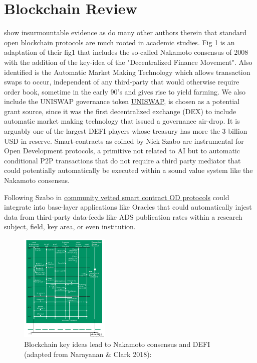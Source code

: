 \documentclass[final,5p,times,twocolumn,authoryear]{elsarticle}
\begin{document}
\section{Blockchain Review}
\label{sec:bc_review}
\cite{20d30b4efb014b21b7ab27f5218692ab} show insurmountable evidence as do many other authors therein that standard open blockchain protocols are much rooted in academic studies. Fig \ref{fig:narayanan} is an adaptation of their fig1 that includes the so-called Nakamoto consensus of 2008 with the addition of the key-idea of the "Decentralized Finance Movement". Also identified is the Automatic Market Making Technology which allows transaction swaps to occur, independent of any third-party that would otherwise require order book, sometime in the early 90's and gives rise to yield farming. We also include the UNISWAP governance token \href{https://github.com/Uniswap}{UNISWAP}, is  chosen as a potential grant source, since it was the first decentralized exchange (DEX) to include automatic market making technology that issued a governance air-drop. It is arguably one of the largest DEFI players whose treasury has more the 3 billion USD in reserve. Smart-contracts as coined by Nick Szabo are instrumental for Open Development protocols, a primitive not related to AI but to automatic conditional P2P transactions that do not require a third party mediator that could potentially automatically be executed within a sound value system like the Nakamoto consensus. 

Following Szabo in \href{https://www.fon.hum.uva.nl/rob/Courses/InformationInSpeech/CDROM/Literature/LOTwinterschool2006/szabo.best.vwh.net/smart_contracts_2.html}{community vetted smart contract OD protocols} could integrate into base-layer applications like Oracles that could automatically injest data from third-party data-feeds like ADS publication rates within a research subject, field, key area,  or even institution.


\begin{figure}
    \centering
    \label{fig:narayanan}
    \includegraphics[width=0.38\textwidth]{narayanan3.png}
    \vspace*{-0.3cm}
    \caption{Blockchain key ideas lead to Nakamoto consensus and DEFI\\ (adapted from Narayanan \& Clark 2018): \href{https://queue.acm.org/detail.cfm?id=3136559}{}}
\end{figure}
\end{document}

